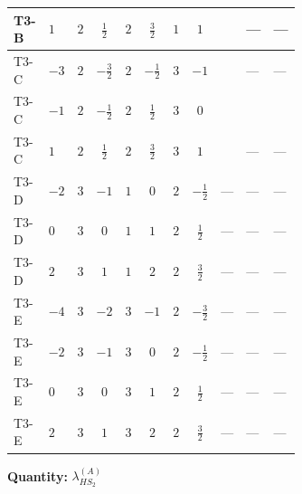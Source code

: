 \documentclass[8pt]{article}
\begin{document}
\begin{landscape}
\begin{longtable}{@{}llcccccc >{\raggedright\arraybackslash}p{0.21\linewidth} >{\raggedright\arraybackslash}p{0.21\linewidth} >{\raggedright\arraybackslash}p{0.21\linewidth}@{}}
\midrule
T3-B & $1$ & $2$ & $\frac{1}{2}$ & $2$ & $\frac{3}{2}$ & $1$ & $1$ & \scriptsize\adjustbox{max width=\linewidth}{$\begin{gathered} +{\lambda_{12}^{(A)}} {\lambda_{HS_1}^{(A)}}\end{gathered}$} & --- & --- \\
\midrule
T3-C & $-3$ & $2$ & $-\frac{3}{2}$ & $2$ & $-\frac{1}{2}$ & $3$ & $-1$ & \scriptsize\adjustbox{max width=\linewidth}{$\begin{gathered} +{\lambda_{12}^{(A)}} {\lambda_{HS_1}^{(A)}}\end{gathered}$} & --- & --- \\
\midrule
T3-C & $-1$ & $2$ & $-\frac{1}{2}$ & $2$ & $\frac{1}{2}$ & $3$ & $0$ & \scriptsize\adjustbox{max width=\linewidth}{$\begin{gathered} +{\lambda_{12}^{(A)}} {\lambda_{HS_1}^{(A)}}\end{gathered}$} & \scriptsize\adjustbox{max width=\linewidth}{$\begin{gathered} -4 {\lambda_{10}} \left({\lambda_{H H^\dagger S_1^\dagger S_2^\dagger}^{\rm Cross}}\right)^{*}\end{gathered}$} & \scriptsize\adjustbox{max width=\linewidth}{$\begin{gathered} -4 {\lambda_{H H^\dagger S_1^\dagger S_2^\dagger}^{\rm Cross}} (2 \left({\lambda_{H H^\dagger S_1^\dagger S_2^\dagger}^{\rm Cross}}\right)^{*}+\left({\lambda_{10}}\right)^{*})\end{gathered}$} \\
\midrule
T3-C & $1$ & $2$ & $\frac{1}{2}$ & $2$ & $\frac{3}{2}$ & $3$ & $1$ & \scriptsize\adjustbox{max width=\linewidth}{$\begin{gathered} +{\lambda_{12}^{(A)}} {\lambda_{HS_1}^{(A)}}\end{gathered}$} & --- & --- \\
\midrule
T3-D & $-2$ & $3$ & $-1$ & $1$ & $0$ & $2$ & $-\frac{1}{2}$ & --- & --- & --- \\
\midrule
T3-D & $0$ & $3$ & $0$ & $1$ & $1$ & $2$ & $\frac{1}{2}$ & --- & --- & --- \\
\midrule
T3-D & $2$ & $3$ & $1$ & $1$ & $2$ & $2$ & $\frac{3}{2}$ & --- & --- & --- \\
\midrule
T3-E & $-4$ & $3$ & $-2$ & $3$ & $-1$ & $2$ & $-\frac{3}{2}$ & --- & --- & --- \\
\midrule
T3-E & $-2$ & $3$ & $-1$ & $3$ & $0$ & $2$ & $-\frac{1}{2}$ & --- & --- & --- \\
\midrule
T3-E & $0$ & $3$ & $0$ & $3$ & $1$ & $2$ & $\frac{1}{2}$ & --- & --- & --- \\
\midrule
T3-E & $2$ & $3$ & $1$ & $3$ & $2$ & $2$ & $\frac{3}{2}$ & --- & --- & --- \\
\midrule
\bottomrule
\end{longtable}
\clearpage
\noindent\textbf{Quantity: }$\lambda_{HS_2}^{(A)}$\par\smallskip

\end{landscape}
\end{document}
